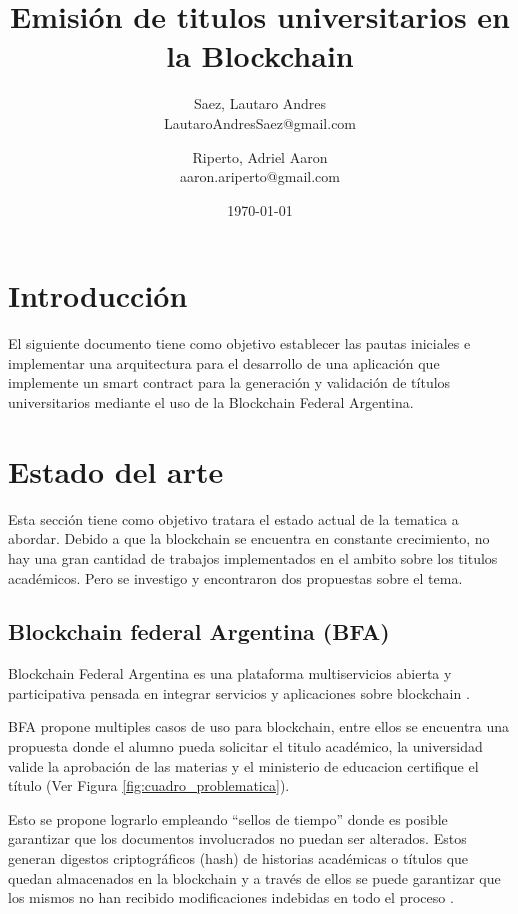 \documentclass[11pt,a4paper]{article}
\title{ 
    Emisión de titulos universitarios
    en la Blockchain
}
\author{
    Saez, Lautaro Andres \\ \small{ LautaroAndresSaez@gmail.com } 
    \and 
    Riperto, Adriel Aaron \\ \small{ aaron.ariperto@gmail.com } 
}
\date{\today}
\begin{document}
    \maketitle

    \section{Introducción}

    El siguiente documento tiene como objetivo establecer las pautas iniciales e implementar una 
    arquitectura para el desarrollo de una aplicación que implemente un smart contract para la generación y 
    validación de títulos universitarios mediante el uso de la Blockchain Federal Argentina. 
    
    \section{Estado del arte}

        Esta sección tiene como objetivo tratara el estado actual de la tematica a abordar.
        Debido a que la blockchain se encuentra en constante crecimiento, no hay una gran cantidad 
        de trabajos implementados en el ambito sobre los titulos académicos. Pero se investigo 
        y encontraron dos propuestas sobre el tema. %

        \subsection{Blockchain federal Argentina (BFA)}


        Blockchain Federal Argentina es una plataforma multiservicios abierta y participativa pensada en integrar servicios y aplicaciones
        sobre blockchain \cite{Blockchain-federal-Argentina}. %
        
        BFA propone multiples casos de uso para blockchain, entre ellos se encuentra una propuesta donde el alumno pueda solicitar
        el titulo académico, la universidad valide la aprobación de las materias y el ministerio de educacion certifique el título (Ver Figura \ref{fig:cuadro_problematica}).

        Esto se propone lograrlo empleando “sellos de tiempo” donde es posible garantizar que los documentos involucrados 
        no puedan ser alterados. Estos generan digestos criptográficos (hash) de historias académicas o títulos que quedan 
        almacenados en la blockchain y a través de ellos se puede garantizar que los mismos no han recibido modificaciones 
        indebidas en todo el proceso \cite{titulos-academicos}. %
 
\end{document}
